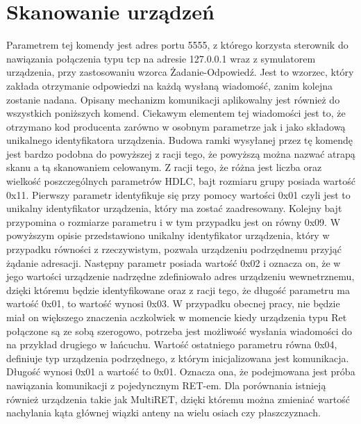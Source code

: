     \section{Skanowanie urządzeń}
    Parametrem tej komendy jest adres portu 5555, z którego korzysta sterownik
    do nawiązania połączenia typu tcp na adresie 127.0.0.1 wraz z symulatorem urządzenia,
    przy zastosowaniu wzorca Żadanie-Odpowiedź. Jest to wzorzec, który zakłada otrzymanie 
    odpowiedzi na każdą wysłaną wiadomość, zanim kolejna zostanie nadana. Opisany mechanizm komunikacji
    aplikowalny jest również do wszystkich poniższych komend.
    Ciekawym elementem tej wiadomości jest to, że otrzymano kod producenta zarówno
    w osobnym parametrze jak i jako składową unikalnego identyfikatora urządzenia.
    \newline\newline
	Budowa ramki wysyłanej przez tę komendę jest bardzo podobna do powyższej z racji tego, że powyższą można nazwać atrapą skanu a tą skanowaniem celowanym.
	Z racji tego, że różna jest liczba oraz wielkość poszczególnych parametrów HDLC, bajt rozmiaru grupy posiada wartość 0x11.
	\newline
	Pierwszy parametr identyfikuje się przy pomocy wartości 0x01 czyli jest to unikalny identyfikator urządzenia, który ma zostać zaadresowany.
	Kolejny bajt przypomina o rozmiarze parametru i w tym przypadku jest on równy 0x09. W powyższym opisie przedstawiono unikalny identyfikator urządzenia, który w przypadku
	równości z rzeczywistym, pozwala urządzeniu podrzędnemu przyjąć żądanie adresacji.
	\newline
	Następny parametr posiada wartość 0x02 i oznacza on, że w jego wartości urządzenie nadrzędne zdefiniowało adres urządzeniu wewnetrznemu, dzięki któremu
	będzie identyfikowane oraz z racji tego, że długość parametru ma wartość 0x01, to wartość wynosi 0x03. W przypadku obecnej pracy, nie będzie miał on większego znaczenia
	aczkolwiek w momencie kiedy urządzenia typu Ret połączone są ze sobą szerogowo, potrzeba jest możliwość wysłania wiadomości do na przykład drugiego w łańcuchu.
	\newline
	Wartość ostatniego parametru równa 0x04, definiuje typ urządzenia podrzędnego, z którym inicjalizowana jest komunikacja. Długość wynosi 0x01 a wartość to 0x01.
	Oznacza ona, że podejmowana jest próba nawiązania komunikacji z pojedyncznym RET-em.
	Dla porównania istnieją również urządzenia takie jak MultiRET, dzięki któremu można zmieniać wartość nachylania kąta głównej wiązki anteny na wielu osiach czy płaszczyznach.

